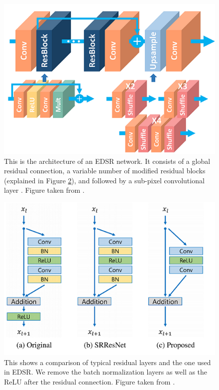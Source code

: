 \documentclass[conference]{IEEEtran}
\begin{document}
\begin{figure}[htbp]
  \centerline{\includegraphics{edsr.PNG}}
  \caption{This is the architecture of an EDSR network. It consists of a global residual connection, a variable number of modified residual blocks (explained in Figure \ref{fig:residual}), and followed by a sub-pixel convolutional layer \cite{b6}. Figure taken from \cite{b5}.}
  \label{fig:edsr}
\end{figure}

\begin{figure}[htbp]
  \centerline{\includegraphics{residual.PNG}}
  \caption{This shows a comparison of typical residual layers and the one used in EDSR. We remove the batch normalization layers as well as the ReLU after the residual connection. Figure taken from \cite{b5}.}
  \label{fig:residual}
\end{figure}
\end{document}
